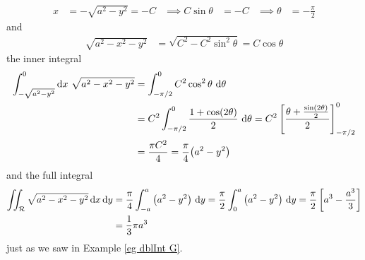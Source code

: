 \begin{eg}
\begin{align*}
x&=-\sqrt{a^2-y^2}=-C &\implies C\sin\theta&=-C 
                      &\implies \theta&=-\frac{\pi}{2} 
\end{align*}
and
\begin{align*}
\sqrt{a^2-x^2-y^2}&=\sqrt{C^2-C^2\sin^2\theta}=C\cos\theta
\end{align*}
the inner integral
\begin{align*}
\int_{-\sqrt{a^2-y^2}}^0\mathrm{d}x\   \sqrt{a^2-x^2-y^2}
&=\int_{-\pi/2}^0 C^2\cos^2\theta\ \mathrm{d}\theta \\
&=C^2\int_{-\pi/2}^0\frac{1+\cos(2\theta)}{2}\ \mathrm{d}\theta
=C^2\left[\frac{\theta+\frac{\sin(2\theta)}{2}}{2}\right]_{-\pi/2}^0 \\
&=\frac{\pi C^2}{4} =\frac{\pi}{4}\big(a^2-y^2\big)
\end{align*}
and the full integral
\begin{align*}
\iint_{\mathcal{R}} \sqrt{a^2-x^2-y^2}\,\mathrm{d}x\,\mathrm{d}y
&=\frac{\pi}{4} \int_{-a}^a \big(a^2-y^2\big)\  \mathrm{d}y
=\frac{\pi}{2} \int_0^a \big(a^2-y^2\big)\  \mathrm{d}y
=\frac{\pi}{2}\left[a^3-\frac{a^3}{3}\right] \\
&=\frac{1}{3}\pi a^3
\end{align*}
just as we saw in Example \ref{eg dblInt G}.

\end{eg}

